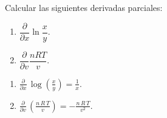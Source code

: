 
{Calcular las siguientes derivadas parciales:
\begin{multicols}{2}
\begin{enumerate}
\item $\dfrac{\partial}{\partial x}\ln \dfrac{x}{y}$.
\item $\dfrac{\partial}{\partial v}\dfrac{nRT}{v}$.
\end{enumerate}
\end{multicols}
}
{\begin{enumerate}

\item $\frac{\partial}{\partial x}\,\log \left(\frac{x}{y}\right) = \frac{1}{x}$.
\item $\frac{\partial}{\partial v}\,\left(\frac{n\,R\,T}{v}\right) = -\frac{n\,R\,T}{v^2}$.
\end{enumerate}
}
{
}


